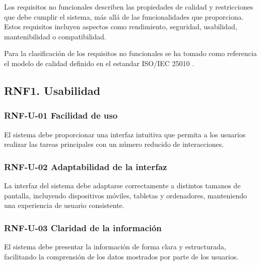 Los requisitos no funcionales describen las propiedades de calidad y restricciones que debe cumplir el sistema, más allá de las funcionalidades que proporciona. Estos requisitos incluyen aspectos como rendimiento, seguridad, usabilidad, mantenibilidad o compatibilidad.

Para la clasificación de los requisitos no funcionales se ha tomado como referencia el modelo de calidad definido en el estandar ISO/IEC 25010 \cite{iso25010}.

\subsection{RNF1. Usabilidad}

\vspace{-0.75em}
\subsubsection{RNF-U-01 Facilidad de uso}
\vspace{-1em}

El sistema debe proporcionar una interfaz intuitiva que permita a los usuarios realizar las tareas principales con un número reducido de interacciones.

\vspace{-0.75em}
\subsubsection{RNF-U-02 Adaptabilidad de la interfaz}
\vspace{-1em}

La interfaz del sistema debe adaptarse correctamente a distintos tamanos de pantalla, incluyendo dispositivos móviles, tabletas y ordenadores, manteniendo una experiencia de usuario consistente.

\vspace{-0.75em}
\subsubsection{RNF-U-03 Claridad de la información}
\vspace{-1em}

El sistema debe presentar la información de forma clara y estructurada, facilitando la comprensión de los datos mostrados por parte de los usuarios.

